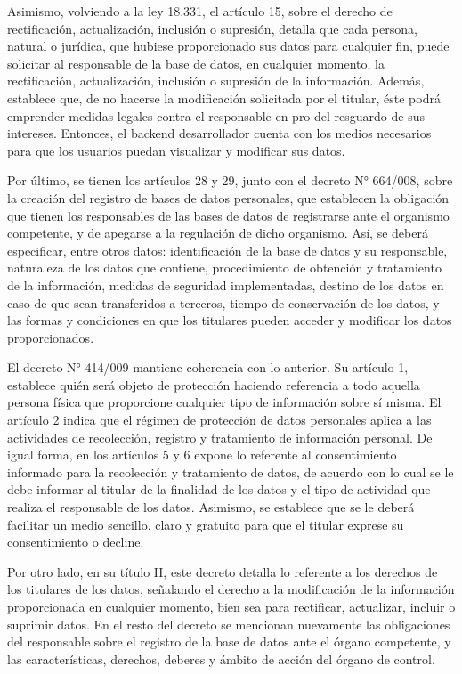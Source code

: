 Asimismo, volviendo a la ley 18.331, el artículo 15, sobre el derecho de rectificación, actualización, inclusión o supresión, detalla que cada persona, natural o jurídica, que hubiese proporcionado sus datos para cualquier fin, puede solicitar al responsable de la base de datos, en cualquier momento, la rectificación, actualización, inclusión o supresión de la información. Además, establece que, de no hacerse la modificación solicitada por el titular, éste podrá emprender medidas legales contra el responsable en pro del resguardo de sus intereses. Entonces, el backend desarrollador cuenta con los medios necesarios para que los usuarios puedan visualizar y modificar sus datos.

Por último, se tienen los artículos 28 y 29, junto con el decreto N° 664/008, sobre la creación del registro de bases de datos personales, que establecen la obligación que tienen los responsables de las bases de datos de registrarse ante el organismo competente, y de apegarse a la regulación de dicho organismo. Así, se deberá especificar, entre otros datos: identificación de la base de datos y su responsable, naturaleza de los datos que contiene, procedimiento de obtención y tratamiento de la información, medidas de seguridad implementadas, destino de los datos en caso de que sean transferidos a terceros, tiempo de conservación de los datos, y las formas y condiciones en que los titulares pueden acceder y modificar los datos proporcionados.

El decreto N° 414/009 mantiene coherencia con lo anterior. Su artículo 1, establece quién será objeto de protección haciendo referencia a todo aquella persona física que proporcione cualquier tipo de información sobre sí misma. El artículo 2 indica que el régimen de protección de datos personales aplica a las actividades de recolección, registro y tratamiento de información personal. De igual forma, en los artículos 5 y 6 expone lo referente al consentimiento informado para la recolección y tratamiento de datos, de acuerdo con lo cual se le debe informar al titular de la finalidad de los datos y el tipo de actividad que realiza el responsable de los datos. Asimismo, se establece que se le deberá facilitar un medio sencillo, claro y gratuito para que el titular exprese su consentimiento o decline. 

Por otro lado, en su título II, este decreto detalla lo referente a los derechos de los titulares de los datos, señalando el derecho a la modificación de la información proporcionada en cualquier momento, bien sea para rectificar, actualizar, incluir o suprimir datos. En el resto del decreto se mencionan nuevamente las obligaciones del responsable sobre el registro de la base de datos ante el órgano competente, y las características, derechos, deberes y ámbito de acción del órgano de control.

